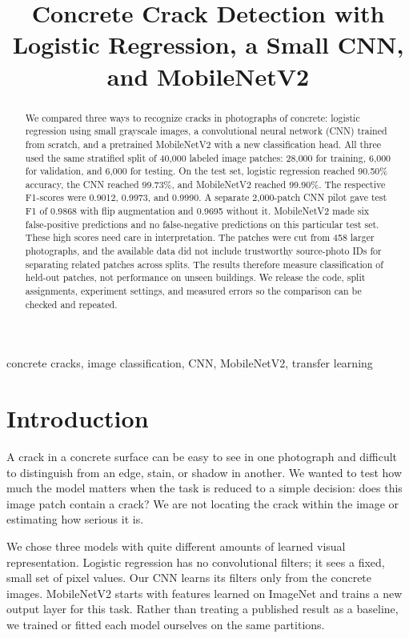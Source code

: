 \documentclass[conference,letterpaper]{IEEEtran}
\title{Concrete Crack Detection with Logistic Regression, a Small CNN, and MobileNetV2}
\author{\IEEEauthorblockN{Jayapradeep Jayaraman Srinivas \and Harshvardhan Datre}
\IEEEauthorblockA{Department of Computer Science, Texas Christian University\\
Fort Worth, Texas, USA\\COSC 50523 Deep Learning, Fall 2026}}
\begin{document}
\maketitle
\begin{abstract}
We compared three ways to recognize cracks in photographs of concrete: logistic regression using small grayscale images, a convolutional neural network (CNN) trained from scratch, and a pretrained MobileNetV2 with a new classification head. All three used the same stratified split of 40,000 labeled image patches: 28,000 for training, 6,000 for validation, and 6,000 for testing. On the test set, logistic regression reached 90.50\% accuracy, the CNN reached 99.73\%, and MobileNetV2 reached 99.90\%. The respective F1-scores were 0.9012, 0.9973, and 0.9990. A separate 2,000-patch CNN pilot gave test F1 of 0.9868 with flip augmentation and 0.9695 without it. MobileNetV2 made six false-positive predictions and no false-negative predictions on this particular test set. These high scores need care in interpretation. The patches were cut from 458 larger photographs, and the available data did not include trustworthy source-photo IDs for separating related patches across splits. The results therefore measure classification of held-out patches, not performance on unseen buildings. We release the code, split assignments, experiment settings, and measured errors so the comparison can be checked and repeated.
\end{abstract}
\begin{IEEEkeywords}
concrete cracks, image classification, CNN, MobileNetV2, transfer learning
\end{IEEEkeywords}
\section{Introduction}
A crack in a concrete surface can be easy to see in one photograph and difficult to distinguish from an edge, stain, or shadow in another. We wanted to test how much the model matters when the task is reduced to a simple decision: does this image patch contain a crack? We are not locating the crack within the image or estimating how serious it is.

We chose three models with quite different amounts of learned visual representation. Logistic regression has no convolutional filters; it sees a fixed, small set of pixel values. Our CNN learns its filters only from the concrete images. MobileNetV2 starts with features learned on ImageNet and trains a new output layer for this task. Rather than treating a published result as a baseline, we trained or fitted each model ourselves on the same partitions.
\end{document}
